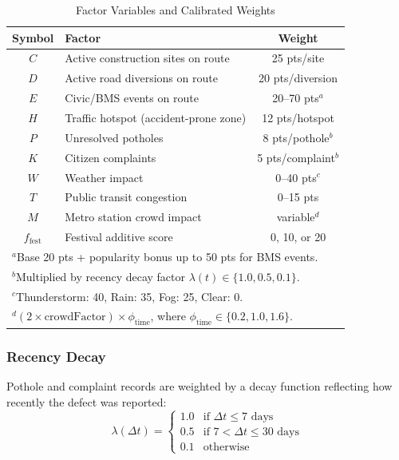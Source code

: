 \documentclass[conference]{IEEEtran}
\begin{document}
\begin{table}[htbp]
\caption{Factor Variables and Calibrated Weights}
\begin{center}
\begin{tabular}{clc}
\toprule
\textbf{Symbol} & \textbf{Factor} & \textbf{Weight} \\
\midrule
$C$ & Active construction sites on route & 25 pts/site \\
$D$ & Active road diversions on route & 20 pts/diversion \\
$E$ & Civic/BMS events on route & 20--70 pts$^{a}$ \\
$H$ & Traffic hotspot (accident-prone zone) & 12 pts/hotspot \\
$P$ & Unresolved potholes & 8 pts/pothole$^{b}$ \\
$K$ & Citizen complaints & 5 pts/complaint$^{b}$ \\
$W$ & Weather impact & 0--40 pts$^{c}$ \\
$T$ & Public transit congestion & 0--15 pts \\
$M$ & Metro station crowd impact & variable$^{d}$ \\
$f_{\text{fest}}$ & Festival additive score & 0, 10, or 20 \\
\bottomrule
\multicolumn{3}{l}{$^{a}$Base 20 pts + popularity bonus up to 50 pts for BMS events.}\\
\multicolumn{3}{l}{$^{b}$Multiplied by recency decay factor $\lambda(t) \in \{1.0, 0.5, 0.1\}$.}\\
\multicolumn{3}{l}{$^{c}$Thunderstorm: 40, Rain: 35, Fog: 25, Clear: 0.}\\
\multicolumn{3}{l}{$^{d}$$(2 \times \text{crowdFactor}) \times \phi_{\text{time}}$, where $\phi_{\text{time}} \in \{0.2, 1.0, 1.6\}$.}\\
\end{tabular}
\label{tab:weights}
\end{center}
\end{table}

\subsubsection{Recency Decay}
Pothole and complaint records are weighted by a decay function reflecting how recently the defect was reported:
\begin{equation}
\lambda(\Delta t) =
\begin{cases}
1.0 & \text{if } \Delta t \leq 7 \text{ days} \\
0.5 & \text{if } 7 < \Delta t \leq 30 \text{ days} \\
0.1 & \text{otherwise}
\end{cases}
\label{eq:decay}
\end{equation}
\end{document}
